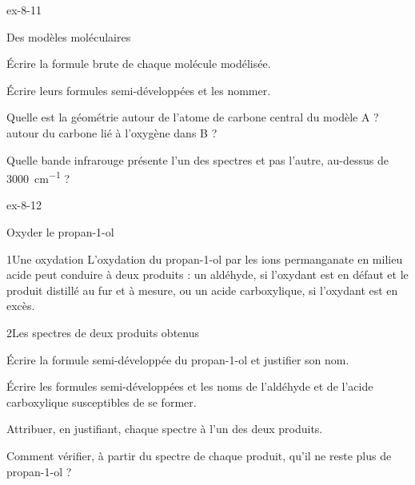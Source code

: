 \begin{blocLivre}{ex-8-11}
\begin{exercice}[2]{Des modèles moléculaires}
\begin{questions}
\item Écrire la formule brute de chaque molécule modélisée.
\item Écrire leurs formules semi-développées et les nommer.
\item Quelle est la géométrie autour de l'atome de carbone central du modèle A ? autour du carbone lié à l'oxygène dans B ?
\item Quelle bande infrarouge présente l'un des spectres et pas l'autre, au-dessus de \qty{3000}{cm^{-1}} ?
\end{questions}
\end{exercice}
\end{blocLivre}
\begin{blocLivre}{ex-8-12}
\begin{exercice}[3]{Oxyder le propan-1-ol}
\begin{docu}{1}{Une oxydation}
L'oxydation du propan-1-ol par les ions permanganate en milieu acide peut conduire à deux produits : un aldéhyde, si
l'oxydant est en défaut et le produit distillé au fur et à mesure, ou un acide carboxylique, si l'oxydant est en excès.
\end{docu}
\begin{docu}{2}{Les spectres de deux produits obtenus}
\end{docu}
\begin{questions}
\item Écrire la formule semi-développée du propan-1-ol et justifier son nom.
\item Écrire les formules semi-développées et les noms de l'aldéhyde et de l'acide carboxylique susceptibles de se former.
\item Attribuer, en justifiant, chaque spectre à l'un des deux produits.
\item \initiative Comment vérifier, à partir du spectre de chaque produit, qu'il ne reste plus de propan-1-ol ?
\end{questions}
\end{exercice}
\end{blocLivre}
